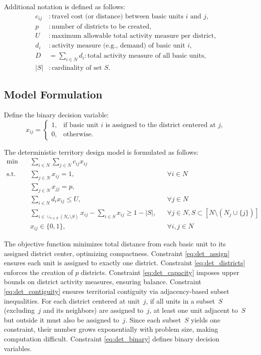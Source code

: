 \documentclass[preprint,12pt,authoryear]{elsarticle}
\begin{document}
Additional notation is defined as follows:
\[
\begin{aligned}
c_{ij} & : \text{travel cost (or distance) between basic units } i \text{ and } j, \\
p & : \text{number of districts to be created}, \\
U & : \text{maximum allowable total activity measure per district}, \\
d_i & : \text{activity measure (e.g., demand) of basic unit } i, \\
D & = \sum_{i \in N} d_i : \text{total activity measure of all basic units}, \\
|S| & : \text{cardinality of set } S.
\end{aligned}
\]

\subsection{Model Formulation}

Define the binary decision variable:
\[
x_{ij} =
\begin{cases}
1, & \text{if basic unit } i \text{ is assigned to the district centered at } j, \\
0, & \text{otherwise.}
\end{cases}
\]

The deterministic territory design model is formulated as follows:
\begin{align}
\min \quad & \sum_{i\in N}\sum_{j\in N} c_{ij}x_{ij} \label{eq:det_obj} \\
\text{s.t.} \quad & \sum_{j\in N} x_{ij} = 1, && \forall i\in N \label{eq:det_assign} \\
& \sum_{j\in N} x_{jj} = p, \label{eq:det_districts} \\
& \sum_{i\in N} d_i x_{ij} \leqslant U, && \forall j\in N \label{eq:det_capacity} \\
& \sum_{i\in \cup_{v\in S}(N_v\setminus S)} x_{ij} - \sum_{i\in S} x_{ij} \geqslant 1 - |S|, && \forall j\in N, S \subset [N \setminus (N_j \cup \{j\})] \label{eq:det_contiguity} \\
& x_{ij} \in \{0,1\}, && \forall i,j \in N \label{eq:det_binary}
\end{align}

The objective function minimizes total distance from each basic unit to its assigned district center, optimizing compactness. 
Constraint \eqref{eq:det_assign} ensures each unit is assigned to exactly one district. 
Constraint \eqref{eq:det_districts} enforces the creation of \(p\) districts. 
Constraint \eqref{eq:det_capacity} imposes upper bounds on district activity measures, ensuring balance. 
Constraint \eqref{eq:det_contiguity} ensures territorial contiguity via adjacency-based subset inequalities. For each district centered at unit~$j$, if all units in a subset~$S$ (excluding~$j$ and its neighbors) are assigned to~$j$, at least one unit adjacent to~$S$ but outside it must also be assigned to~$j$. Since each subset~$S$ yields one constraint, their number grows exponentially with problem size, making computation difficult. 
Constraint \eqref{eq:det_binary} defines binary decision variables.
\end{document}
